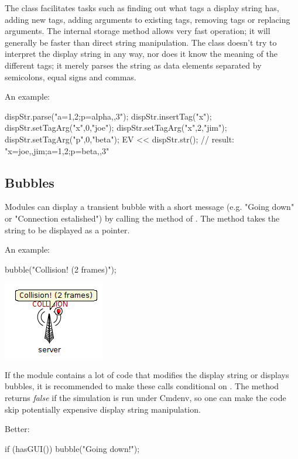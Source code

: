 The class facilitates tasks such as finding out what tags a display string
has, adding new tags, adding arguments to existing tags,
removing tags or replacing arguments. The internal storage method allows
very fast operation; it will generally be faster than direct string manipulation.
The class doesn't try to interpret the display string in any way, nor does
it know the meaning of the different tags; it merely parses the string
as data elements separated by semicolons, equal signs and commas.

An example:

\begin{cpp}
dispStr.parse("a=1,2;p=alpha,,3");
dispStr.insertTag("x");
dispStr.setTagArg("x",0,"joe");
dispStr.setTagArg("x",2,"jim");
dispStr.setTagArg("p",0,"beta");
EV << dispStr.str();  // result: "x=joe,,jim;a=1,2;p=beta,,3"
\end{cpp}

\subsection{Bubbles}

Modules can display a transient bubble with a short message (e.g. "Going
down" or "Connection estalished") by calling the  method of
. The method takes the string to be displayed as a
 pointer.

An example:
\begin{cpp}
bubble("Collision! (2 frames)");
\end{cpp}

\begin{center}
\includegraphics{figures/graphics-bubble}
\end{center}

If the module contains a lot of code that modifies the display string or
displays bubbles, it is recommended to make these calls conditional
on . The  method returns \textit{false}
if the simulation is run under Cmdenv, so one can make the code skip
potentially expensive display string manipulation.

Better:
\begin{cpp}
if (hasGUI())
    bubble("Going down!");
\end{cpp}



